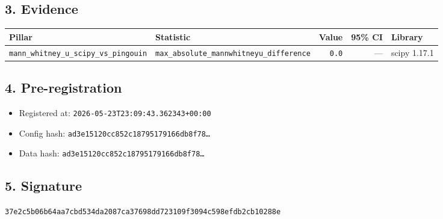 \documentclass{article}
\begin{document}
\subsection*{3. Evidence}
\begin{tabular}{llrrl}\toprule
\textbf{Pillar} & \textbf{Statistic} & \textbf{Value} & \textbf{95\% CI} & \textbf{Library} \\\midrule
\texttt{mann\_whitney\_u\_scipy\_vs\_pingouin} & \texttt{max\_absolute\_mannwhitneyu\_difference} & \texttt{0.0} & --- & scipy 1.17.1 \\
\bottomrule\end{tabular}
\subsection*{4. Pre-registration}
\begin{itemize}
\item Registered at: \texttt{2026-05-23T23:09:43.362343+00:00}
\item Config hash: \texttt{ad3e15120cc852c18795179166db8f78\dots}
\item Data hash: \texttt{ad3e15120cc852c18795179166db8f78\dots}
\end{itemize}
\subsection*{5. Signature}
\texttt{37e2c5b06b64aa7cbd534da2087ca37698dd723109f3094c598efdb2cb10288e}\\
\end{document}
